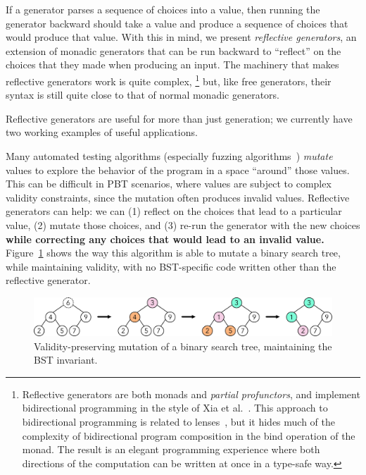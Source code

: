 If a generator parses a sequence of choices into a value, then running the
generator backward should take a value and produce a sequence of choices that
would produce that value. With this in mind, we present {\em reflective
generators}, an extension of monadic generators that can be run backward to
``reflect'' on the choices that they made when producing an input. The machinery
that makes reflective generators work is quite complex,%
\footnote{Reflective generators are both monads and {\em partial profunctors},
and implement bidirectional programming in the style of Xia et
al.~\cite{xia2019composing}. This approach to bidirectional programming is
related to lenses~\cite{foster2009bidirectional}, but it hides much of the
complexity of bidirectional program composition in the bind operation of the
monad. The result is an elegant programming experience where both directions of
the computation can be written at once in a type-safe way.} but, like free
generators, their syntax is still quite close to that of normal monadic
generators.

Reflective generators are useful for more than just generation; we currently
have two working examples of useful applications.

 Many automated testing algorithms
(especially fuzzing algorithms~\cite{afl-readme}) {\em mutate} values to explore
the behavior of the program in a space ``around'' those values. This can be
difficult in PBT scenarios, where values are subject to complex validity
constraints, since the mutation often produces invalid values. Reflective
generators can help: we can (1) reflect on the choices that lead to a particular
value, (2) mutate those choices, and (3) re-run the generator with the new
choices {\bf while correcting any choices that
would lead to an invalid value.} Figure~\ref{fig:mutation} shows the way this
algorithm is able to mutate a binary search tree, while maintaining validity,
with no BST-specific code written other than the reflective generator.

\begin{figure}[h]
  \centering
  \includegraphics[width=.8\textwidth]{assets/mutate-diagram.pdf}
  \caption{Validity-preserving mutation of a binary search tree, maintaining the
  BST invariant.}\label{fig:mutation}
\end{figure}

